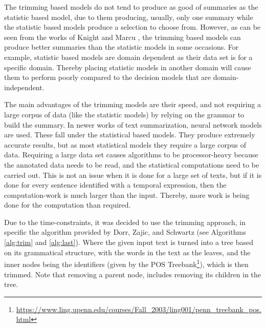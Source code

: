 \par The trimming based models do not tend to produce as good of summaries as the statistic based model, due to them producing, usually, only one summary while the statistic based models produce a selection to choose from. However, as can be seen from the works of Knight and Marcu \cite{knightmarcu2000}, the trimming based models can produce better summaries than the statistic models in some occasions. For example, statistic based models are domain dependent as their data set is for a specific domain. Thereby placing statistic models in another domain will cause them to perform poorly compared to the decision models that are domain-independent. 
\par The main advantages of the trimming models are their speed, and not requiring a large corpus of data (like the statistic models) by relying on the grammar to build the summary. In newer works of text summarization, neural network models are used. These fall under the statistical based models. They produce extremely accurate results, but as most statistical models they require a large corpus of data. Requiring a large data set causes algorithms to be processor-heavy because the annotated data needs to be read, and the statistical computations need to be carried out. This is not an issue when it is done for a large set of texts, but if it is done for every sentence identified with a temporal expression, then the computation-work is much larger than the input. Thereby, more work is being done for the computation than required.
\par Due to the time-constraints, it was decided to use the trimming approach, in specific the algorithm provided by Dorr, Zajic, and Schwartz \cite{dorrzajicschwartz2003} (see Algorithms \ref{alg:trim} and \ref{alg:last}). Where the given input text is turned into a tree based on its grammatical structure, with the words in the text as the leaves, and the inner nodes being the identifiers (given by the POS Treebank\footnote{\url{https://www.ling.upenn.edu/courses/Fall_2003/ling001/penn_treebank_pos.html}}), which is then trimmed. Note that removing a parent node, includes removing its children in the tree. \par


